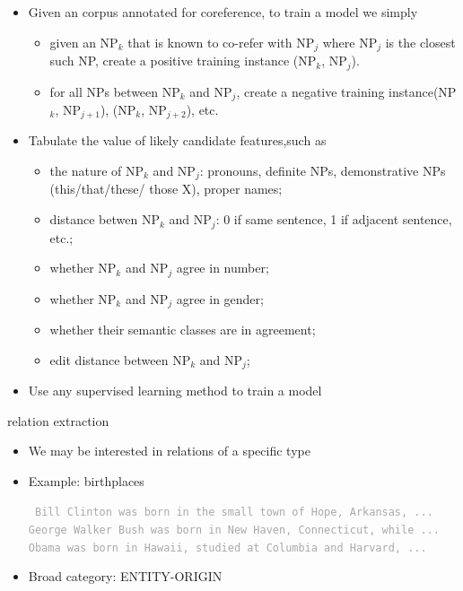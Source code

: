 \documentclass[landscape]{jhuslides3C}
\begin{document}
\vfill
\begin{itemize}
\item Given an corpus annotated for coreference, to train a model we simply
\begin{itemize}
\item given an NP$_k$ that is known to co-refer with NP$_j$ where NP$_j$ is the closest such NP, create
a positive training instance (NP$_k$, NP$_j$).
\item for all NPs between NP$_k$ and NP$_j$, create a negative training instance(NP$_k$, NP$_{j+1}$),
(NP$_k$, NP$_{j+2}$), etc.\pause
\end{itemize}
\item Tabulate the value of likely candidate features,\pause such as
\begin{itemize}
\item the nature of NP$_k$ and NP$_j$: pronouns, definite NPs, demonstrative NPs (this/that/these/
those X), proper names;\pause
\item distance betwen NP$_k$ and NP$_j$: 0 if same sentence, 1 if adjacent sentence, etc.;\pause
\item whether NP$_k$ and NP$_j$ agree in number;\pause
\item whether NP$_k$ and NP$_j$ agree in gender;\pause
\item whether their semantic classes are in agreement;\pause
\item edit distance between NP$_k$ and NP$_j$;
\end{itemize}
\item Use any supervised learning method to train a model
\end{itemize}
\vfill


\slide{}
\vspace{85mm}
\begin{center}
{\huge relation extraction}
\end{center}


\vfill
\begin{itemize}\itemsep 1cm
\item We may be interested in relations of a specific type
\item Example: birthplaces
\textcolor{darkgrey}{\begin{flushleft} \tt
Bill Clinton was born in the small town of Hope, Arkansas, ...
George Walker Bush was born in New Haven, Connecticut, while ...\\
Obama was born in Hawaii, studied at Columbia and Harvard, ...\\
\end{flushleft}}
\item Broad category: {\small ENTITY-ORIGIN}
\end{itemize}
\vfill
\end{document}
